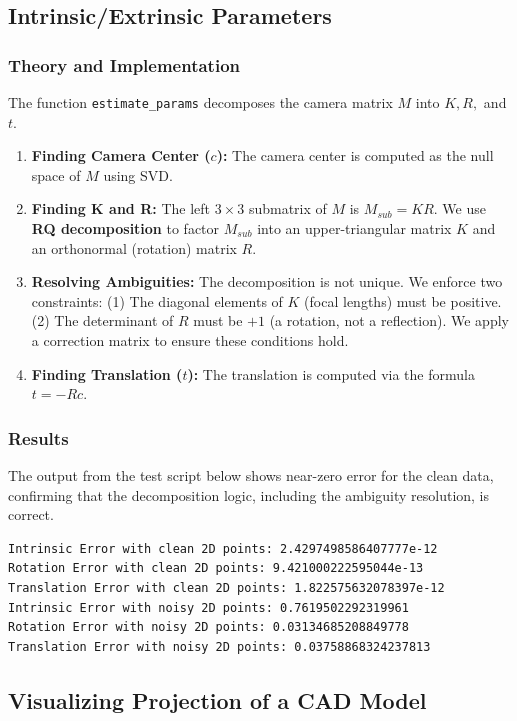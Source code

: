 \documentclass{article}
\begin{document}
\subsection{Intrinsic/Extrinsic Parameters}
\subsubsection{Theory and Implementation}
The function \texttt{estimate\_params} decomposes the camera matrix $M$ into $K, R,$ and $t$.
\begin{enumerate}
    \item \textbf{Finding Camera Center ($c$):} The camera center is computed as the null space of $M$ using SVD.
    \item \textbf{Finding K and R:} The left $3 \times 3$ submatrix of $M$ is $M_{sub} = KR$. We use \textbf{RQ decomposition} to factor $M_{sub}$ into an upper-triangular matrix $K$ and an orthonormal (rotation) matrix $R$.
    \item \textbf{Resolving Ambiguities:} The decomposition is not unique. We enforce two constraints: (1) The diagonal elements of $K$ (focal lengths) must be positive. (2) The determinant of $R$ must be $+1$ (a rotation, not a reflection). We apply a correction matrix to ensure these conditions hold.
    \item \textbf{Finding Translation ($t$):} The translation is computed via the formula $t = -Rc$.
\end{enumerate}

\subsubsection{Results}
The output from the test script below shows near-zero error for the clean data, confirming that the decomposition logic, including the ambiguity resolution, is correct.
\begin{verbatim}
Intrinsic Error with clean 2D points: 2.4297498586407777e-12
Rotation Error with clean 2D points: 9.421000222595044e-13
Translation Error with clean 2D points: 1.822575632078397e-12
Intrinsic Error with noisy 2D points: 0.7619502292319961
Rotation Error with noisy 2D points: 0.03134685208849778
Translation Error with noisy 2D points: 0.03758868324237813
\end{verbatim}

\subsection{Visualizing Projection of a CAD Model}
\end{document}
